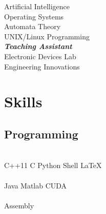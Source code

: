 \documentclass[letterpaper]{deedy-resume} %
\begin{document}
\begin{minipage}[t]{0.27\textwidth}
Artificial Intelligence \\
Operating Systems \\
Automata Theory\\
UNIX/Linux Programming \\
{\footnotesize \textit{\textbf{Teaching Assistant}}} \\
Electronic Devices Lab\\
Engineering Innovations

\sectionspace %


\section{Skills}

\subsection{Programming}

 \\
C++11 \textbullet{} C \textbullet{} Python \textbullet{} Shell \textbullet{} \LaTeX\ \\
 \\
Java \textbullet{} Matlab \textbullet{} CUDA \\
 \\
Assembly

\sectionspace %


\end{minipage} %
\hfill
%
%
\end{document}
